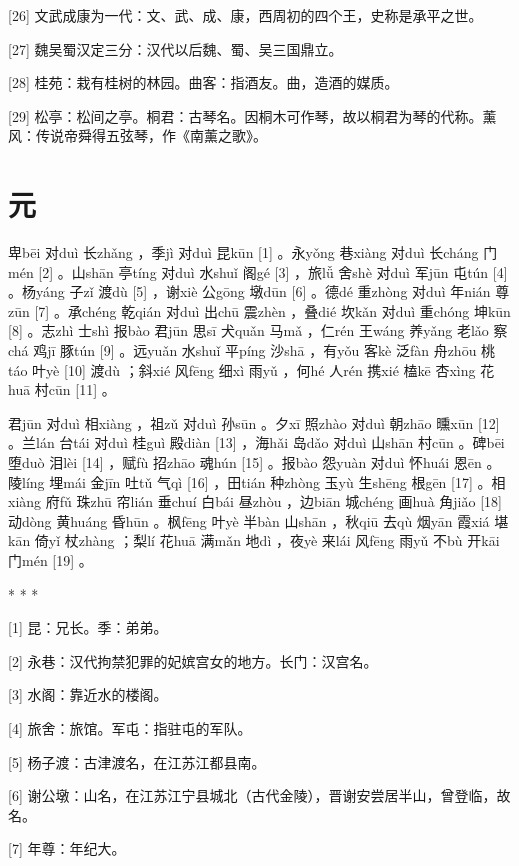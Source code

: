 \documentclass[12pt,UTF8]{ctexbook}
\begin{document}
[26] 文武成康为一代：文、武、成、康，西周初的四个王，史称是承平之世。

[27] 魏吴蜀汉定三分：汉代以后魏、蜀、吴三国鼎立。

[28] 桂苑：栽有桂树的林园。曲客：指酒友。曲，造酒的媒质。

[29] 松亭：松间之亭。桐君：古琴名。因桐木可作琴，故以桐君为琴的代称。薰风：传说帝舜得五弦琴，作《南薰之歌》。





\chapter{元}


卑bēi 对duì 长zhǎng ，季jì 对duì 昆kūn [1] 。永yǒng 巷xiàng 对duì 长cháng 门mén [2] 。山shān 亭tíng 对duì 水shuǐ 阁gé [3] ，旅lǚ 舍shè 对duì 军jūn 屯tún [4] 。杨yáng 子zǐ 渡dù [5] ，谢xiè 公gōng 墩dūn [6] 。德dé 重zhòng 对duì 年nián 尊zūn [7] 。承chéng 乾qián 对duì 出chū 震zhèn ，叠dié 坎kǎn 对duì 重chóng 坤kūn [8] 。志zhì 士shì 报bào 君jūn 思sī 犬quǎn 马mǎ ，仁rén 王wáng 养yǎng 老lǎo 察chá 鸡jī 豚tún [9] 。远yuǎn 水shuǐ 平píng 沙shā ，有yǒu 客kè 泛fàn 舟zhōu 桃táo 叶yè [10] 渡dù ；斜xié 风fēng 细xì 雨yǔ ，何hé 人rén 携xié 榼kē 杏xìng 花huā 村cūn [11] 。

君jūn 对duì 相xiàng ，祖zǔ 对duì 孙sūn 。夕xī 照zhào 对duì 朝zhāo 曛xūn [12] 。兰lán 台tái 对duì 桂guì 殿diàn [13] ，海hǎi 岛dǎo 对duì 山shān 村cūn 。碑bēi 堕duò 泪lèi [14] ，赋fù 招zhāo 魂hún [15] 。报bào 怨yuàn 对duì 怀huái 恩ēn 。陵líng 埋mái 金jīn 吐tǔ 气qì [16] ，田tián 种zhòng 玉yù 生shēng 根gēn [17] 。相xiàng 府fǔ 珠zhū 帘lián 垂chuí 白bái 昼zhòu ，边biān 城chéng 画huà 角jiǎo [18] 动dòng 黄huáng 昏hūn 。枫fēng 叶yè 半bàn 山shān ，秋qiū 去qù 烟yān 霞xiá 堪kān 倚yǐ 杖zhàng ；梨lí 花huā 满mǎn 地dì ，夜yè 来lái 风fēng 雨yǔ 不bù 开kāi 门mén [19] 。



* * *



[1] 昆：兄长。季：弟弟。

[2] 永巷：汉代拘禁犯罪的妃嫔宫女的地方。长门：汉宫名。

[3] 水阁：靠近水的楼阁。

[4] 旅舍：旅馆。军屯：指驻屯的军队。

[5] 杨子渡：古津渡名，在江苏江都县南。

[6] 谢公墩：山名，在江苏江宁县城北（古代金陵），晋谢安尝居半山，曾登临，故名。

[7] 年尊：年纪大。
\end{document}
